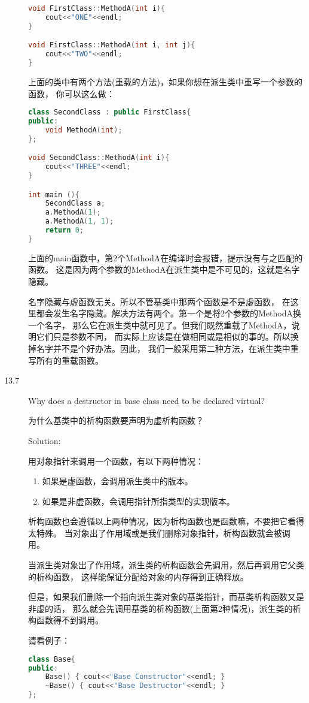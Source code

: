 \begin{description}
\begin{lstlisting}[language=C++]
void FirstClass::MethodA(int i){
    cout<<"ONE"<<endl;
}

void FirstClass::MethodA(int i, int j){
    cout<<"TWO"<<endl;
}
\end{lstlisting}
上面的类中有两个方法(重载的方法)，如果你想在派生类中重写一个参数的函数， 你可以这么做：
\begin{lstlisting}[language=C++]
class SecondClass : public FirstClass{
public:
    void MethodA(int);
};

void SecondClass::MethodA(int i){
    cout<<"THREE"<<endl;
}

int main (){
    SecondClass a;
    a.MethodA(1);
    a.MethodA(1, 1);
    return 0;
}
\end{lstlisting}
上面的main函数中，第2个MethodA在编译时会报错，提示没有与之匹配的函数。 这是因为两个参数的MethodA在派生类中是不可见的，这就是名字隐藏。

名字隐藏与虚函数无关。所以不管基类中那两个函数是不是虚函数， 在这里都会发生名字隐藏。解决方法有两个。第一个是将2个参数的MethodA换一个名字， 那么它在派生类中就可见了。但我们既然重载了MethodA，说明它们只是参数不同， 而实际上应该是在做相同或是相似的事的。所以换掉名字并不是个好办法。因此， 我们一般采用第二种方法，在派生类中重写所有的重载函数。


\item[13.7] Why does a destructor in base class need to be declared virtual?

为什么基类中的析构函数要声明为虚析构函数？

Solution: 

用对象指针来调用一个函数，有以下两种情况：
\begin{enumerate}
\item 如果是虚函数，会调用派生类中的版本。
\item 如果是非虚函数，会调用指针所指类型的实现版本。
\end{enumerate}
析构函数也会遵循以上两种情况，因为析构函数也是函数嘛，不要把它看得太特殊。 当对象出了作用域或是我们删除对象指针，析构函数就会被调用。

当派生类对象出了作用域，派生类的析构函数会先调用，然后再调用它父类的析构函数， 这样能保证分配给对象的内存得到正确释放。

但是，如果我们删除一个指向派生类对象的基类指针，而基类析构函数又是非虚的话， 那么就会先调用基类的析构函数(上面第2种情况)，派生类的析构函数得不到调用。

请看例子：
\begin{lstlisting}[language=C++]
class Base{
public:
    Base() { cout<<"Base Constructor"<<endl; }
    ~Base() { cout<<"Base Destructor"<<endl; }
};


\end{lstlisting}
\end{description}
